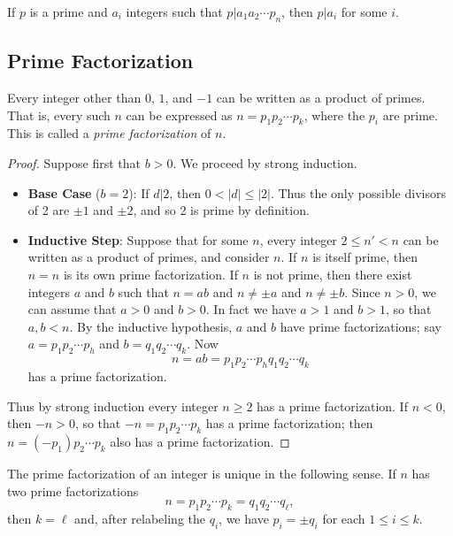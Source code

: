 \begin{cor}
If \(p\) is a prime and \(a_i\) integers such that \(p|a_1a_2 \cdots p_n\), then \(p|a_i\) for some \(i\).
\end{cor}



\subsection*{Prime Factorization}

\begin{thm}
Every integer other than \(0\), \(1\), and \(-1\) can be written as a product of primes. That is, every such \(n\) can be expressed as \(n = p_1p_2 \cdots p_k\), where the \(p_i\) are prime. This is called a \emph{prime factorization} of \(n\).
\end{thm}

\begin{proof}
Suppose first that \(b > 0\). We proceed by strong induction.
\begin{itemize}
\item \textbf{Base Case} (\(b = 2\)): If \(d|2\), then \(0 < |d| \leq |2|\). Thus the only possible divisors of 2 are \(\pm 1\) and \(\pm 2\), and so 2 is prime by definition.
\item \textbf{Inductive Step}: Suppose that for some \(n\), every integer \(2 \leq n' < n\) can be written as a product of primes, and consider \(n\). If \(n\) is itself prime, then \(n = n\) is its own prime factorization. If \(n\) is not prime, then there exist integers \(a\) and \(b\) such that \(n = ab\) and \(n \neq \pm a\) and \(n \neq \pm b\). Since \(n > 0\), we can assume that \(a > 0\) and \(b > 0\). In fact we have \(a > 1\) and \(b > 1\), so that \(a,b < n\). By the inductive hypothesis, \(a\) and \(b\) have prime factorizations; say \(a = p_1p_2 \cdots p_h\) and \(b = q_1q_2 \cdots q_k\). Now \[ n = ab = p_1p_2 \cdots p_h q_1q_2 \cdots q_k \] has a prime factorization.
\end{itemize}
Thus by strong induction every integer \(n \geq 2\) has a prime factorization. If \(n < 0\), then \(-n > 0\), so that \(-n = p_1p_2 \cdots p_k\) has a prime factorization; then \(n = (-p_1)p_2 \cdots p_k\) also has a prime factorization.
\end{proof}

\begin{thm}
The prime factorization of an integer is unique in the following sense. If \(n\) has two prime factorizations \[ n = p_1p_2 \cdots p_k = q_1q_2 \cdots q_\ell, \] then \(k = \ell\) and, after relabeling the \(q_i\), we have \(p_i = \pm q_i\) for each \(1 \leq i \leq k\).
\end{thm}

